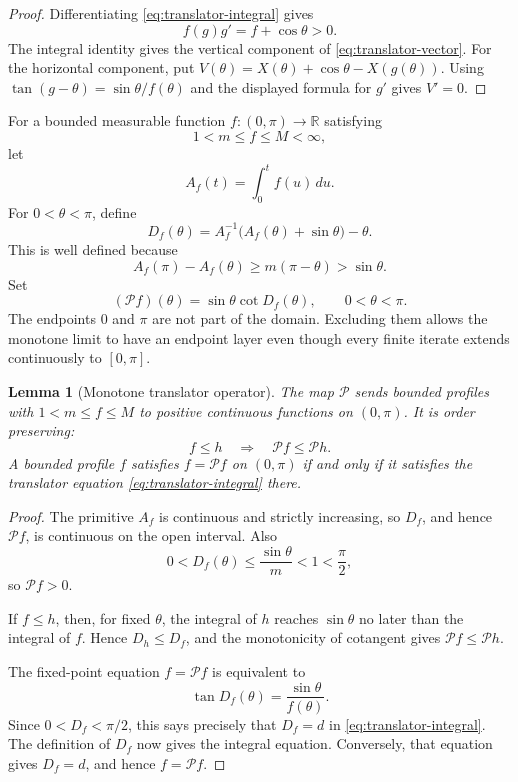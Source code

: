 \documentclass[11pt]{article}
\newtheorem{lemma}[theorem]{Lemma}
\theoremstyle{remark}
\begin{document}
\begin{proof}
Differentiating \eqref{eq:translator-integral} gives
\[
  f(g)g'=f+\cos\theta>0.
\]
The integral identity gives the vertical component of
\eqref{eq:translator-vector}.  For the horizontal component, put
$V(\theta)=X(\theta)+\cos\theta-X(g(\theta))$.  Using
$\tan(g-\theta)=\sin\theta/f(\theta)$ and the displayed formula for $g'$
gives $V'=0$.
\end{proof}

For a bounded measurable function
\(f:(0,\pi)\to\mathbb R\) satisfying
\[
   1<m\leq f\leq M<\infty,
\]
let
\[
   A_f(t)=\int_0^t f(u)\,du.
\]
For \(0<\theta<\pi\), define
\begin{equation}\label{eq:Df-def}
   D_f(\theta)
   =A_f^{-1}\bigl(A_f(\theta)+\sin\theta\bigr)-\theta.
\end{equation}
This is well defined because
\[
   A_f(\pi)-A_f(\theta)
      \geq m(\pi-\theta)>\sin\theta.
\]
Set
\begin{equation}\label{eq:Poperator}
   (\mathcal Pf)(\theta)=\sin\theta\cot D_f(\theta),
   \qquad 0<\theta<\pi.
\end{equation}
The endpoints \(0\) and \(\pi\) are not part of the domain.  Excluding them
allows the monotone limit to have an endpoint layer even though every finite
iterate extends continuously to \([0,\pi]\).

\begin{lemma}[Monotone translator operator]\label{lem:Pmonotone}
The map \(\mathcal P\) sends bounded profiles with
\(1<m\leq f\leq M\) to positive continuous functions on \((0,\pi)\).
It is order preserving:
\[
   f\leq h\quad\Longrightarrow\quad \mathcal Pf\leq\mathcal Ph.
\]
A bounded profile \(f\) satisfies \(f=\mathcal Pf\) on \((0,\pi)\) if
and only if it satisfies the translator equation
\eqref{eq:translator-integral} there.
\end{lemma}

\begin{proof}
The primitive \(A_f\) is continuous and strictly increasing, so
\(D_f\), and hence \(\mathcal Pf\), is continuous on the open interval.
Also
\[
   0<D_f(\theta)\leq\frac{\sin\theta}{m}<1<\frac\pi2,
\]
so \(\mathcal Pf>0\).

If \(f\leq h\), then, for fixed \(\theta\), the integral of \(h\) reaches
\(\sin\theta\) no later than the integral of \(f\).  Hence
\(D_h\leq D_f\), and the monotonicity of cotangent gives
\(\mathcal Pf\leq\mathcal Ph\).

The fixed-point equation \(f=\mathcal Pf\) is equivalent to
\[
   \tan D_f(\theta)=\frac{\sin\theta}{f(\theta)}.
\]
Since \(0<D_f<\pi/2\), this says precisely that \(D_f=d\) in
\eqref{eq:translator-integral}.  The definition of \(D_f\) now gives the
integral equation.  Conversely, that equation gives \(D_f=d\), and hence
\(f=\mathcal Pf\).
\end{proof}
\end{document}
